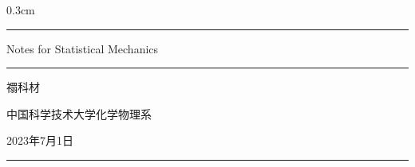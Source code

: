 \documentclass[hyperref,UTF-8]{ctexart}
\newcommand{\0}{\boldsymbol{0}}
\newcommand{\setparDis}{\setlength{\parskip} {0.3cm} }
\begin{document}
\setparDis

\begin{titlepage}
    \centering


    \rule{\textwidth}{1pt}   %
    \vspace{0.2\textheight}  %


    {\Huge Notes for Statistical Mechanics}

    \vspace{0.025\textheight}   %

    \rule{0.83\textwidth}{0.4pt}  %

    \vspace{0.1\textheight}  %


    {\Large \textsc{\kaishu 禤科材}}

    \vspace{0.015\textheight}

    {\Large \textsc{\kaishu 中国科学技术大学\;化学物理系}}

    \vfill  %

    {\large \kaishu 2023年7月1日}
    \vspace{0.1\textheight}  %


    \rule{\textwidth}{1pt}  %

  \end{titlepage}


\nocite{*}

\tableofcontents

\pagebreak
\fontsize{12pt}{16pt}
\end{document}
